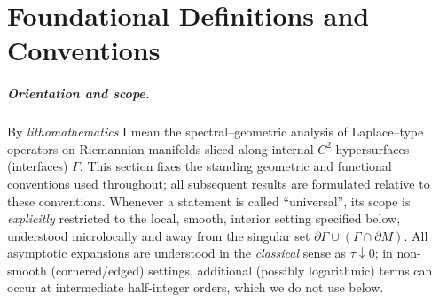 

\providecommand{\vol}{\operatorname{vol}}
\providecommand{\Dom}{\operatorname{Dom}}
\providecommand{\Spec}{\operatorname{Spec}}
\providecommand{\Tr}{\operatorname{Tr}}

\chapter*{Foundational Definitions and Conventions}\label{sec:definitions}

\paragraph{Orientation and scope.}
By \emph{lithomathematics} I mean the spectral–geometric analysis of Laplace–type operators on Riemannian manifolds sliced along internal $C^2$ hypersurfaces (interfaces) $\Gamma$.
This section fixes the standing geometric and functional conventions used throughout; all subsequent results are formulated relative to these conventions.
Whenever a statement is called “universal”, its scope is \emph{explicitly} restricted to the local, smooth, interior setting specified below, understood microlocally and away from the singular set $\partial\Gamma\cup(\Gamma\cap\partial M)$.
All asymptotic expansions are understood in the \emph{classical} sense as $\tau\downarrow 0$; in non-smooth (cornered/edged) settings, additional (possibly logarithmic) terms can occur at intermediate half-integer orders, which we do not use below.

